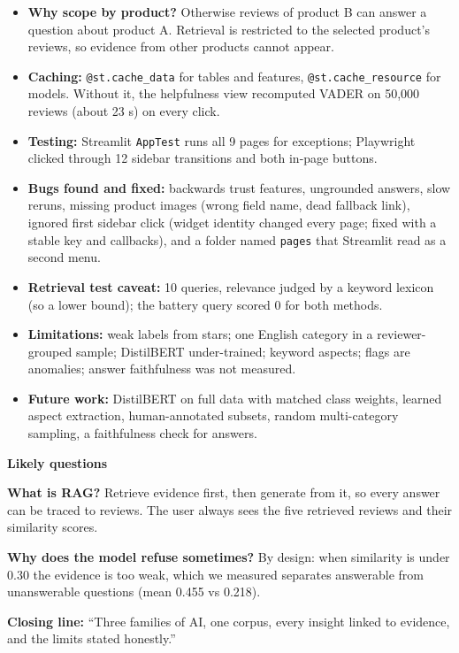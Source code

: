 \documentclass[10pt,a4paper]{article}
\begin{document}
\begin{itemize}
\item \textbf{Why scope by product?} Otherwise reviews of product B can answer a question about product A. Retrieval is restricted to the selected product's reviews, so evidence from other products cannot appear.
\item \textbf{Caching:} \texttt{@st.cache\_data} for tables and features, \texttt{@st.cache\_resource} for models. Without it, the helpfulness view recomputed VADER on 50,000 reviews (about 23 s) on every click.
\item \textbf{Testing:} Streamlit \texttt{AppTest} runs all 9 pages for exceptions; Playwright clicked through 12 sidebar transitions and both in-page buttons.
\item \textbf{Bugs found and fixed:} backwards trust features, ungrounded answers, slow reruns, missing product images (wrong field name, dead fallback link), ignored first sidebar click (widget identity changed every page; fixed with a stable key and callbacks), and a folder named \texttt{pages} that Streamlit read as a second menu.
\item \textbf{Retrieval test caveat:} 10 queries, relevance judged by a keyword lexicon (so a lower bound); the battery query scored 0 for both methods.
\item \textbf{Limitations:} weak labels from stars; one English category in a reviewer-grouped sample; DistilBERT under-trained; keyword aspects; flags are anomalies; answer faithfulness was not measured.
\item \textbf{Future work:} DistilBERT on full data with matched class weights, learned aspect extraction, human-annotated subsets, random multi-category sampling, a faithfulness check for answers.
\end{itemize}
\par\vspace{2pt}\textbf{Likely questions}\par\vspace{1pt}
\begin{qa}\textbf{What is RAG?} Retrieve evidence first, then generate from it, so every answer can be traced to reviews. The user always sees the five retrieved reviews and their similarity scores.\end{qa}\vspace{2pt}
\begin{qa}\textbf{Why does the model refuse sometimes?} By design: when similarity is under 0.30 the evidence is too weak, which we measured separates answerable from unanswerable questions (mean 0.455 vs 0.218).\end{qa}\vspace{2pt}
\begin{qa}\textbf{Closing line:} ``Three families of AI, one corpus, every insight linked to evidence, and the limits stated honestly.''\end{qa}
\newpage
\end{document}
